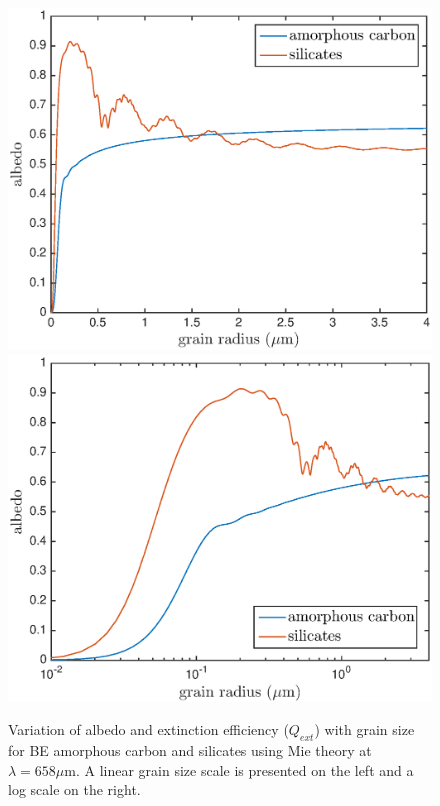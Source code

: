 \documentclass[useAMS,usenatbib,usegraphicx]{mnras}
\begin{document}
\begin{figure}
\includegraphics[trim =0 0 0 0,clip=true,scale=0.42]{albedo_grainsize_upto4}
\hspace{3mm}
\includegraphics[trim =0 0 0 0,clip=true,scale=0.42]{albedo_grainsize_upto4_log}
\caption{Variation of albedo and extinction efficiency ($Q_{ext}$) with grain size for \citet{Zubko1996} BE amorphous carbon and \citet{Draine1984} silicates using Mie theory at $\lambda = 658 \mu $m. A linear grain size scale is presented on the left and a log scale on the right.}
\label{albedo_grain}

\end{figure}
\end{document}
